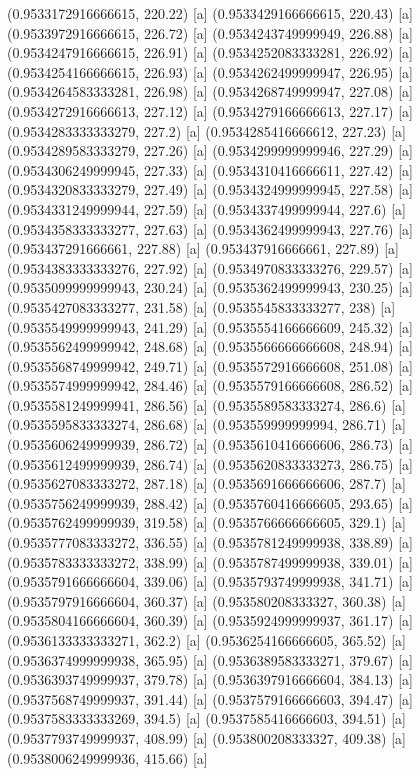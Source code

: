 {{{(0.9533172916666615, 220.22) [a] 
(0.9533429166666615, 220.43) [a] 
(0.9533972916666615, 226.72) [a] 
(0.9534243749999949, 226.88) [a] 
(0.9534247916666615, 226.91) [a] 
(0.9534252083333281, 226.92) [a] 
(0.9534254166666615, 226.93) [a] 
(0.9534262499999947, 226.95) [a] 
(0.9534264583333281, 226.98) [a] 
(0.9534268749999947, 227.08) [a] 
(0.9534272916666613, 227.12) [a] 
(0.9534279166666613, 227.17) [a] 
(0.9534283333333279, 227.2) [a] 
(0.9534285416666612, 227.23) [a] 
(0.9534289583333279, 227.26) [a] 
(0.9534299999999946, 227.29) [a] 
(0.9534306249999945, 227.33) [a] 
(0.9534310416666611, 227.42) [a] 
(0.9534320833333279, 227.49) [a] 
(0.9534324999999945, 227.58) [a] 
(0.9534331249999944, 227.59) [a] 
(0.9534337499999944, 227.6) [a] 
(0.9534358333333277, 227.63) [a] 
(0.9534362499999943, 227.76) [a] 
(0.953437291666661, 227.88) [a] 
(0.953437916666661, 227.89) [a] 
(0.9534383333333276, 227.92) [a] 
(0.9534970833333276, 229.57) [a] 
(0.9535099999999943, 230.24) [a] 
(0.9535362499999943, 230.25) [a] 
(0.9535427083333277, 231.58) [a] 
(0.9535545833333277, 238) [a] 
(0.9535549999999943, 241.29) [a] 
(0.9535554166666609, 245.32) [a] 
(0.9535562499999942, 248.68) [a] 
(0.9535566666666608, 248.94) [a] 
(0.9535568749999942, 249.71) [a] 
(0.9535572916666608, 251.08) [a] 
(0.9535574999999942, 284.46) [a] 
(0.9535579166666608, 286.52) [a] 
(0.9535581249999941, 286.56) [a] 
(0.9535589583333274, 286.6) [a] 
(0.9535595833333274, 286.68) [a] 
(0.953559999999994, 286.71) [a] 
(0.9535606249999939, 286.72) [a] 
(0.9535610416666606, 286.73) [a] 
(0.9535612499999939, 286.74) [a] 
(0.9535620833333273, 286.75) [a] 
(0.9535627083333272, 287.18) [a] 
(0.9535691666666606, 287.7) [a] 
(0.9535756249999939, 288.42) [a] 
(0.9535760416666605, 293.65) [a] 
(0.9535762499999939, 319.58) [a] 
(0.9535766666666605, 329.1) [a] 
(0.9535777083333272, 336.55) [a] 
(0.9535781249999938, 338.89) [a] 
(0.9535783333333272, 338.99) [a] 
(0.9535787499999938, 339.01) [a] 
(0.9535791666666604, 339.06) [a] 
(0.9535793749999938, 341.71) [a] 
(0.9535797916666604, 360.37) [a] 
(0.953580208333327, 360.38) [a] 
(0.9535804166666604, 360.39) [a] 
(0.9535924999999937, 361.17) [a] 
(0.9536133333333271, 362.2) [a] 
(0.9536254166666605, 365.52) [a] 
(0.9536374999999938, 365.95) [a] 
(0.9536389583333271, 379.67) [a] 
(0.9536393749999937, 379.78) [a] 
(0.9536397916666604, 384.13) [a] 
(0.9537568749999937, 391.44) [a] 
(0.9537579166666603, 394.47) [a] 
(0.9537583333333269, 394.5) [a] 
(0.9537585416666603, 394.51) [a] 
(0.9537793749999937, 408.99) [a] 
(0.953800208333327, 409.38) [a] 
(0.9538006249999936, 415.66) [a] 
}}}
